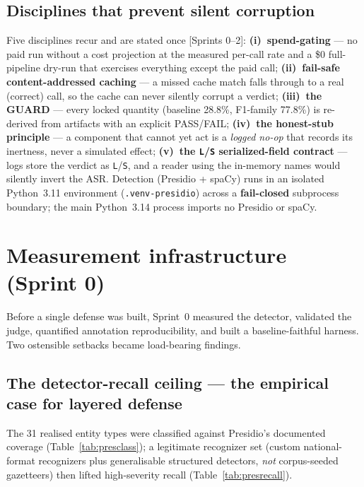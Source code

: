 \documentclass[11pt,a4paper]{article}
\newcommand{\code}[1]{\texttt{\small #1}}
\newcommand{\src}[1]{{\footnotesize\textcolor{gray!55!black}{[#1]}}}
\begin{document}
\subsection{Disciplines that prevent silent corruption}
Five disciplines recur and are stated once \src{Sprints 0--2}: \textbf{(i)~spend-gating} --- no paid
run without a cost projection at the measured per-call rate and a \$0 full-pipeline dry-run that
exercises everything except the paid call; \textbf{(ii)~fail-safe content-addressed caching} --- a
missed cache match falls through to a real (correct) call, so the cache can never silently corrupt a
verdict; \textbf{(iii)~the GUARD} --- every locked quantity (baseline 28.8\%, F1-family 77.8\%) is
re-derived from artifacts with an explicit PASS/FAIL; \textbf{(iv)~the honest-stub principle} --- a
component that cannot yet act is a \emph{logged no-op} that records its inertness, never a simulated
effect; \textbf{(v)~the \code{L}/\code{S} serialized-field contract} --- logs store the verdict as
\code{L}/\code{S}, and a reader using the in-memory names would silently invert the ASR. Detection
(Presidio + spaCy) runs in an isolated Python~3.11 environment (\code{.venv-presidio}) across a
\textbf{fail-closed} subprocess boundary; the main Python~3.14 process imports no Presidio or spaCy.

\section{Measurement infrastructure (Sprint 0)}
\label{sec:s0}

Before a single defense was built, Sprint~0 measured the detector, validated the judge, quantified
annotation reproducibility, and built a baseline-faithful harness. Two ostensible setbacks became
load-bearing findings.

\subsection{The detector-recall ceiling --- the empirical case for layered defense}
The 31 realised entity types were classified against Presidio's documented coverage
(Table~\ref{tab:presclass}); a legitimate recognizer set (custom national-format recognizers plus
generalisable structured detectors, \emph{not} corpus-seeded gazetteers) then lifted high-severity
recall (Table~\ref{tab:presrecall}).
\end{document}
